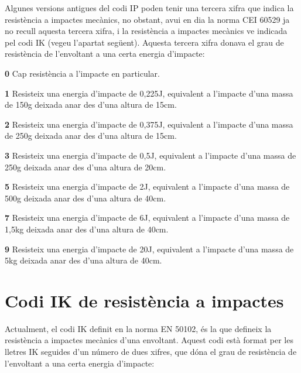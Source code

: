 Algunes versions antigues del codi \textsf{IP} poden tenir una tercera xifra que indica la resist\`{e}ncia a impactes mec\`{a}nics, no obstant, avui en dia la norma \textsf{CEI 60529} ja no recull aquesta tercera xifra, i la resist\`{e}ncia a impactes mec\`{a}nics ve indicada pel codi \textsf{IK} (vegeu l'apartat seg\"{u}ent). Aquesta tercera xifra donava el grau de resist\`{e}ncia de l'envoltant a una certa energia d'impacte:
\begin{list}{}
   {\setlength{\labelwidth}{10mm} \setlength{\leftmargin}{10mm} \setlength{\labelsep}{2mm}}
   \item[\textbf{0}] Cap resist\`{e}ncia a l'impacte en particular.
   \item[\textbf{1}] Resisteix una energia d'impacte de 0{,}225\unit{J}, equivalent a l'impacte d'una massa de 150\unit{g} deixada anar des d'una altura de 15\unit{cm}.
   \item[\textbf{2}] Resisteix una energia d'impacte de 0{,}375\unit{J}, equivalent a l'impacte d'una massa de 250\unit{g} deixada anar des d'una altura de 15\unit{cm}.
   \item[\textbf{3}] Resisteix una energia d'impacte de 0{,}5\unit{J}, equivalent a l'impacte d'una massa de 250\unit{g} deixada anar des d'una altura de 20\unit{cm}.
   \item[\textbf{5}] Resisteix una energia d'impacte de 2\unit{J}, equivalent a l'impacte d'una massa de 500\unit{g} deixada anar des d'una altura de 40\unit{cm}.
   \item[\textbf{7}] Resisteix una energia d'impacte de 6\unit{J}, equivalent a l'impacte d'una massa de 1{,}5\unit{kg} deixada anar des d'una altura de 40\unit{cm}.
   \item[\textbf{9}]Resisteix una energia d'impacte de 20\unit{J}, equivalent a l'impacte d'una massa de 5\unit{kg} deixada anar des d'una altura de 40\unit{cm}.
\end{list}

\section{Codi IK de resist\`{e}ncia a impactes}   

Actualment, el codi \textsf{IK} definit en la norma \textsf{EN 50102}, \'{e}s la que defineix la resist\`{e}ncia  a impactes mec\`{a}nics d'una envoltant. Aquest codi est\`{a} format per les lletres \textsf{IK} seguides d'un n\'{u}mero de dues xifres, que d\'{o}na el grau de resist\`{e}ncia de l'envoltant a una certa energia d'impacte:

